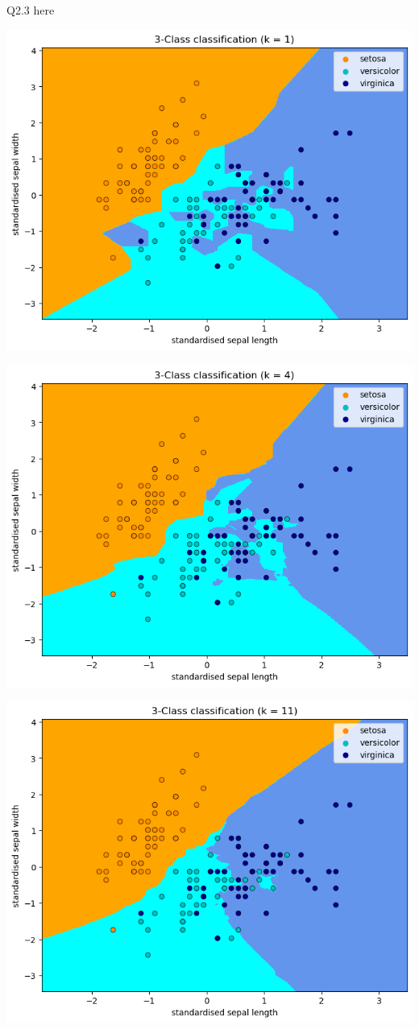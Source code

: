 \documentclass[12pt]{article}
\begin{document}
Q2.3 here

\includegraphics[scale = 0.5]{2.3.1.png}

\includegraphics[scale = 0.5]{2.3.2.png}

\includegraphics[scale = 0.5]{2.3.3.png}
\end{document}
